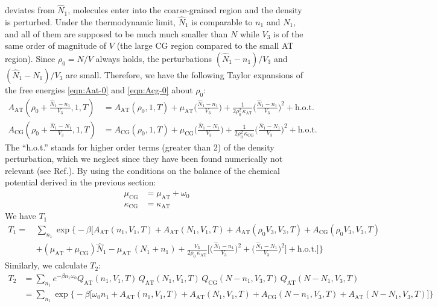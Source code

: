 \documentclass[aip,jcp,a4paper,reprint,onecolumn]{revtex4-1}
\newcommand{\AT}{{\textrm{{AT}}}}
\newcommand{\CG}{{\textrm{CG}}}
\begin{document}
deviates from $\hat N_1$, molecules enter into the coarse-grained
region and the density is perturbed.
Under the thermodynamic
limit, $\hat N_1$ is comparable to $n_1$ and $N_1$, and all of them are
supposed to be much much smaller than $N$ while $V_3$ is of the same order of magnitude of $V$ (the large CG region compared to the small AT region).
Since $\rho_0 = N/V$ always holds, the perturbations
$(\hat N_1 - n_1)/{V_3}$
and $(\hat N_1 - N_1)/{V_3}$ are small.
Therefore, we have the following
Taylor expansions of the free energies \eqref{eqn:Aat-0} and \eqref{eqn:Acg-0}
about $\rho_0$:
\begin{align}
  A_{\AT}(\rho_0 + \frac{\hat N_1 - n_1}{V_3},1,T)
  &= A_{\AT}(\rho_0,1,T)
  +\mu_{\AT}
  \Big(
  \frac{\hat N_1 - n_1}{V_3}
  \Big)
  +
  \frac1{2\rho_0^2\,\kappa_{\AT}}
  \Big(
  \frac{\hat N_1 - n_1}{V_3}
  \Big)^2
  + \textrm{h.o.t.} \\
  A_{\CG}(\rho_0 + \frac{\hat N_1 - N_1}{V_3},1,T)
  &= A_{\CG}(\rho_0,1,T)
  +\mu_{\CG}
  \Big(
  \frac{\hat N_1 - N_1}{V_3}
  \Big)
  +
  \frac1{2\rho_0^2\,\kappa_{\CG}}
  \Big(
  \frac{\hat N_1 - N_1}{V_3}
  \Big)^2
  + \textrm{h.o.t.} 
\end{align}
The ``h.o.t.'' stands for higher order terms (greater than 2)
of the density perturbation, which we neglect since they have been found numerically not relevant (see Ref.\cite{rdfcorr}).
By using the conditions on the balance of the chemical potential derived in the previous section:
\begin{align}\label{eqn:mu-eq}
  \mu_{\CG} &= \mu_{\AT} + \omega_0\\\label{eqn:kappa-eq}
  \kappa_{\CG} &= \kappa_{\AT}
\end{align}
We have $T_1$
\begin{align}\nonumber
  T_1
  = \,&
  \sum_{n_1}
  \exp
  \Big\{-\beta
  \Big[
  A_{\AT}(n_1,V_1,T) +
  A_{\AT}(N_1,V_1,T) +
  A_{\AT}(\rho_0V_3,V_3,T) +
  A_{\CG}(\rho_0V_3,V_3,T) \\
  \,&+(\mu_\AT + \mu_\CG)\hat N_1
  -\mu_{\AT}\,(N_1 + n_1) +
  \frac{V_3}{2\rho_0\, \kappa_{\AT}}
  \Big[
  \Big(
  \frac{\hat N_1 - n_1}{V_3}
  \Big)^2
  +
  \Big(
  \frac{\hat N_1 - N_1}{V_3}
  \Big)^2
  \Big]
  +\textrm{h.o.t.}
  \Big]
  \Big\}
\end{align}
Similarly, we calculate $T_2$:
\begin{align}\nonumber
  T_2
  &=
  \sum_{n_1}
  e^{-\beta n_1\omega_0}
  Q_{\AT}(n_1,V_1,T)\,
  Q_{\AT}(N_1,V_1,T)\,
  Q_{\CG}(N-n_1,V_3,T)\,
  Q_{\AT}(N-N_1,V_3,T) \\\nonumber
  &=
  \sum_{n_1}
  \exp
  \big\{-\beta
  \big[
  \omega_0n_1 +
  A_{\AT}(n_1,V_1,T) +
  A_{\AT}(N_1,V_1,T) +
  A_{\CG}(N-n_1,V_3,T) +
  A_{\AT}(N-N_1,V_3,T)
  \big]
  \big\}
\end{align}
\end{document}
